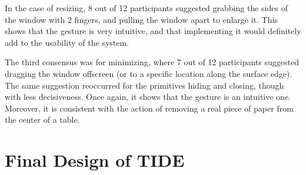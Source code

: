 In the case of resizing, 8 out of 12 participants suggested grabbing the sides of the window with 2 fingers, and pulling the window apart to enlarge it.
This shows that the gesture is very intuitive, and that implementing it would definitely add to the usability of the system.

The third consensus was for minimizing, where 7 out of 12 participants suggested dragging the window offscreen (or to a specific location along the surface edge).
The same suggestion reoccurred for the primitives hiding and closing, though with less decisiveness.
Once again, it shows that the gesture is an intuitive one.
Moreover, it is consistent with the action of removing a real piece of paper from the center of a table.

\section{Final Design of TIDE}
\label{sec:design}

